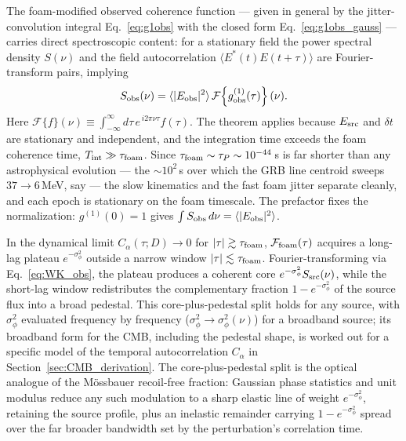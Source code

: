 \documentclass[aps,prd,onecolumn,amsmath,amssymb]{revtex4-2}
\begin{document}
The foam-modified observed coherence function — given in general by the
jitter-convolution integral Eq.~\eqref{eq:g1obs} with the closed form
Eq.~\eqref{eq:g1obs_gauss} — carries direct
spectroscopic content: for a stationary field the power spectral density
$S(\nu)$ and the field autocorrelation
$\langle E^*(t)E(t+\tau)\rangle$ are Fourier-transform pairs,
implying
\begin{equation}
  S_{\rm obs}(\nu) = \langle|E_{\rm obs}|^2\rangle\,
  \mathcal{F}\!\left\{g^{(1)}_{\rm obs}(\tau)\right\}(\nu).
  \label{eq:WK_obs}
\end{equation}
Here $\mathcal{F}\{f\}(\nu)\equiv\int_{-\infty}^{\infty}d\tau\,
e^{\,i2\pi\nu\tau}f(\tau)$.  The theorem applies because
$E_{\rm src}$ and $\delta t$ are stationary and independent, and
the integration time exceeds the foam coherence time,
$T_{\rm int}\gg\tau_{\rm foam}$.  Since
$\tau_{\rm foam}\sim\tau_P\sim10^{-44}$\,s is far shorter than any
astrophysical evolution --- the $\sim\!10^2$\,s over which the GRB line
centroid sweeps $37\to6$\,MeV, say --- the slow kinematics and the fast foam jitter separate
cleanly, and each epoch is stationary on the foam timescale.  The prefactor
fixes the normalization: $g^{(1)}(0)=1$ gives
$\int S_{\rm obs}\,d\nu=\langle|E_{\rm obs}|^2\rangle$.


In the dynamical limit $C_\alpha(\tau;D)\to 0$ for
$|\tau|\gtrsim\tau_{\rm foam}$, $\mathcal{F}_{\rm foam}(\tau)$ acquires
a long-lag plateau $e^{-\sigma_\phi^2}$ outside a narrow window
$|\tau|\lesssim\tau_{\rm foam}$.  Fourier-transforming via
Eq.~\eqref{eq:WK_obs}, the plateau produces a coherent core
$e^{-\sigma_\phi^2}S_{\rm src}(\nu)$, while the short-lag window
redistributes the complementary fraction $1-e^{-\sigma_\phi^2}$ of the
source flux into a broad pedestal.  This core-plus-pedestal split holds
for any source, with $\sigma_\phi^2$ evaluated frequency by frequency
($\sigma_\phi^2\to\sigma_\phi^2(\nu)$) for a broadband source; its
broadband form for the CMB, including the pedestal
shape, is worked out for a specific model of the temporal
autocorrelation $C_\alpha$ in Section~\ref{sec:CMB_derivation}.
The core-plus-pedestal split is the optical analogue of the M\"ossbauer
recoil-free fraction: Gaussian phase statistics and unit modulus reduce any
such modulation to a sharp elastic line of weight $e^{-\sigma_\phi^2}$,
retaining the source profile, plus an inelastic remainder carrying
$1-e^{-\sigma_\phi^2}$ spread over the far broader bandwidth set by the
perturbation's correlation time.
\end{document}
